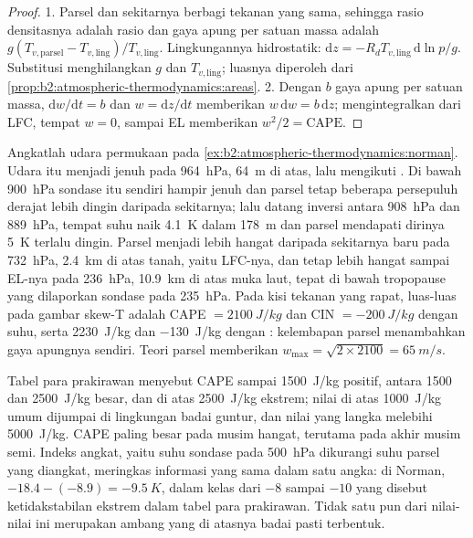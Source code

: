 \begin{proof}
1. Parsel dan sekitarnya berbagi tekanan yang sama, sehingga rasio densitasnya adalah rasio
 dan gaya apung per satuan massa adalah
$g(T_{v,\text{parsel}} - T_{v,\text{ling}})/T_{v,\text{ling}}$. Lingkungannya hidrostatik:
$\mathrm{d}z = -R_dT_{v,\text{ling}}\,\mathrm{d}\ln p/g$. Substitusi menghilangkan $g$ dan
$T_{v,\text{ling}}$; luasnya diperoleh dari \cref{prop:b2:atmospheric-thermodynamics:areas}.
2. Dengan $b$ gaya apung per satuan massa, $\mathrm{d}w/\mathrm{d}t = b$ dan $w = \mathrm{d}z/
\mathrm{d}t$ memberikan $w\,\mathrm{d}w = b\,\mathrm{d}z$; mengintegralkan dari LFC, tempat $w = 0$, sampai
EL memberikan $w^2/2 = \text{CAPE}$.
\end{proof}

\begin{example}\label{ex:b2:atmospheric-thermodynamics:cape}
Angkatlah udara permukaan pada \cref{ex:b2:atmospheric-thermodynamics:norman}. Udara itu menjadi jenuh pada
\qty{964}{hPa}, \qty{64}{m} di atas, lalu mengikuti . Di bawah \qty{900}{hPa} sondase
itu sendiri hampir jenuh dan parsel tetap beberapa persepuluh derajat lebih dingin daripada
sekitarnya; lalu datang inversi antara \qty{908}{hPa} dan \qty{889}{hPa}, tempat
suhu naik \qty{4.1}{K} dalam \qty{178}{m} dan parsel mendapati dirinya \qty{5}{K} terlalu
dingin. Parsel menjadi lebih hangat daripada sekitarnya baru pada \qty{732}{hPa}, \qty{2.4}{km} di atas
tanah, yaitu LFC-nya, dan tetap lebih hangat sampai EL-nya pada \qty{236}{hPa}, \qty{10.9}{km} di atas muka laut,
tepat di bawah tropopause yang dilaporkan sondase pada \qty{235}{hPa}. Pada kisi tekanan yang rapat,
luas-luas pada gambar skew-T adalah CAPE $= \qty{2100}{J/kg}$ dan CIN $= \qty{-200}{J/kg}$ dengan
suhu, serta \qty{2230}{J/kg} dan \qty{-130}{J/kg} dengan : kelembapan
parsel menambahkan gaya apungnya sendiri. Teori parsel memberikan $w_{\max} = \sqrt{2 \times 2100} =
\qty{65}{m/s}$.
\end{example}

Tabel para prakirawan menyebut CAPE sampai \qty{1500}{J/kg} positif, antara 1500 dan
\qty{2500}{J/kg} besar, dan di atas \qty{2500}{J/kg} ekstrem; nilai di atas \qty{1000}{J/kg} umum dijumpai di lingkungan badai guntur,
dan nilai yang langka melebihi \qty{5000}{J/kg}. CAPE paling besar pada musim hangat, terutama pada akhir
musim semi. Indeks angkat, yaitu suhu sondase pada \qty{500}{hPa} dikurangi suhu parsel yang
diangkat, meringkas informasi yang sama dalam satu angka: di Norman, $-18.4 - (-8.9) = \qty{-9.5}{K}$,
dalam kelas dari $-8$ sampai $-10$ yang disebut ketidakstabilan ekstrem dalam tabel para prakirawan. Tidak satu pun
dari nilai-nilai ini merupakan ambang yang di atasnya badai pasti terbentuk.

